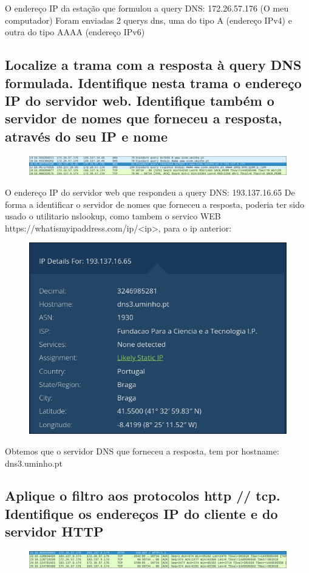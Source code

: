 \documentclass{article}
\begin{document}
O endereço IP da estação que formulou a query DNS: 172.26.57.176 (O meu computador)
Foram enviadas 2 querys dns, uma do tipo A (endereço IPv4) e outra do tipo AAAA (endereço IPv6)

\subsection{Localize a trama com a resposta à query DNS formulada. Identifique nesta trama o endereço IP do
servidor web. Identifique também o servidor de nomes que forneceu a resposta, através do seu IP e nome}

\begin{figure}[h]
    \centering
    \includegraphics[width=1\linewidth]{images/dns_response.png}
\end{figure}

O endereço IP do servidor web que respondeu a query DNS: 193.137.16.65
De forma a identificar o servidor de nomes que forneceu a resposta, poderia ter sido usado o utilitario nslookup, como tambem o servico WEB https://whatismyipaddress.com/ip/\textless ip\textgreater,
para o ip anterior:
\begin{figure}[h]
    \centering
    \includegraphics[width=0.5\linewidth]{images/whats.png}
\end{figure}

Obtemos que o servidor DNS que forneceu a resposta, tem por hostname: dns3.uminho.pt

\subsection{Aplique o filtro aos protocolos http // tcp. Identifique os endereços IP do cliente e do servidor HTTP}
\begin{figure}[h]
    \centering
    \includegraphics[width=1\linewidth]{images/http_ip.png}
\end{figure}
\end{document}
